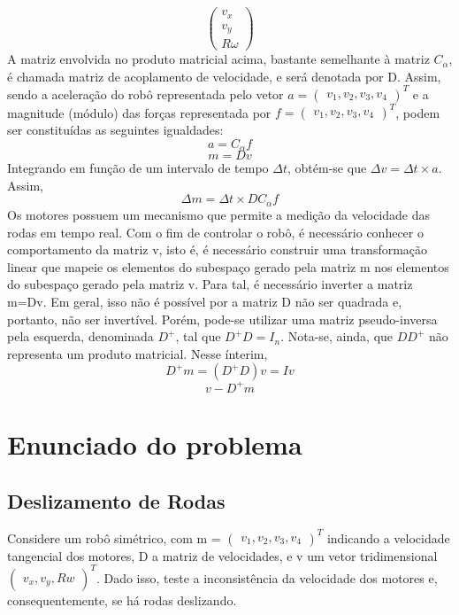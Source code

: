 \documentclass{article}
\begin{document}
\[
\begin{pmatrix}v_{x}\\ v_y \\ R\omega \end{pmatrix}
\]
A matriz envolvida no produto matricial acima, bastante semelhante à matriz $C_\alpha$, é chamada matriz de acoplamento de velocidade, e será denotada por D.
Assim, sendo a aceleração do robô representada pelo vetor $a=\begin{pmatrix}v_{1},v_{2},v_{3},v_{4} \end{pmatrix}^T$ e a magnitude (módulo) das forças representada por $f=\begin{pmatrix}v_{1},v_{2},v_{3},v_{4} \end{pmatrix}^T$, podem ser constituídas as seguintes igualdades:
\[a=C_{\alpha}f\]
\[m=Dv\]
Integrando em função de um intervalo de tempo $\Delta t$, obtém-se que $\Delta v=\Delta t \times a$. Assim,
\[\Delta m=\Delta t\times DC_{\alpha}f\]
Os motores possuem um mecanismo que permite a medição da velocidade das rodas em tempo real. Com o fim de controlar o robô, é necessário conhecer o comportamento da matriz v, isto é, é necessário construir uma transformação linear que mapeie os elementos do subespaço gerado pela matriz m nos elementos do subespaço gerado pela matriz v.
Para tal, é necessário inverter a matriz m=Dv. Em geral, isso não é possível por a matriz D não ser quadrada e, portanto, não ser invertível. Porém, pode-se utilizar uma matriz pseudo-inversa pela esquerda, denominada $D^+$, tal que $D^+ D=I_n$. Nota-se, ainda, que $DD^+$ não representa um produto matricial. Nesse ínterim, 
\[D^+m=(D^+D)v=Iv\]
\[v-D^+m\]



\section{Enunciado do problema}
\subsection{Deslizamento de Rodas}

Considere um robô simétrico, com m = $\begin{pmatrix}v_{1},v_{2},v_{3},v_{4} \end{pmatrix}^T$ indicando a velocidade tangencial dos motores,
D a matriz de velocidades, e v um vetor tridimensional $\begin{pmatrix} v_{x},v_{y},Rw \end{pmatrix}^T$.
Dado isso, teste a inconsistência da velocidade dos motores e, consequentemente, se há rodas deslizando.
\end{document}
